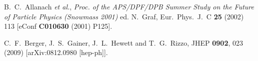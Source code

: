 \begin{thebibliography}{99}
 B.~C.~Allanach \textit{et al.},
\textit{Proc. of the APS/DPF/DPB Summer Study on the Future of
Particle Physics (Snowmass 2001) } ed. N.~Graf, Eur.\ Phys.\ J.\ C
\textbf{25} (2002)
113 [eConf \textbf{C010630} (2001) P125]. %

  C.~F.~Berger, J.~S.~Gainer, J.~L.~Hewett and T.~G.~Rizzo,
  JHEP {\bf 0902}, 023 (2009)
  [arXiv:0812.0980 [hep-ph]].


%


\end{thebibliography}


